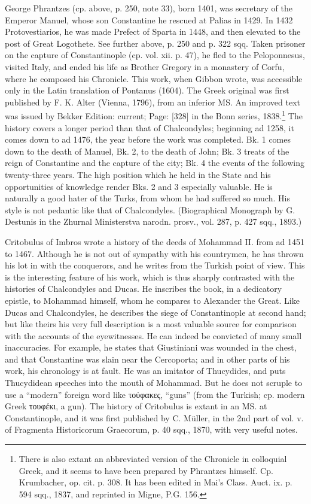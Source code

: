 George Phrantzes (cp. above, p. 250, note 33), born 1401, was secretary of the Emperor Manuel, whose son Constantine he rescued at Palias in 1429. In 1432 Protovestiarios, he was made Prefect of Sparta in 1448, and then elevated to the post of Great Logothete. See further above, p. 250 and p. 322 sqq. Taken prisoner on the capture of Constantinople (cp. vol. xii. p. 47), he fled to the Peloponnesus, visited Italy, and ended his life as Brother Gregory in a monastery of Corfu, where he composed his Chronicle. This work, when Gibbon wrote, was accessible only in the Latin translation of Pontanus (1604). The Greek original was first published by F. K. Alter (Vienna, 1796), from an inferior MS. An improved text was issued by Bekker Edition: current; Page: [328] in the Bonn series, 1838.\footnote{There is also extant an abbreviated version of the Chronicle in colloquial Greek, and it seems to have been prepared by Phrantzes himself. Cp. Krumbacher, op. cit. p. 308. It has been edited in Mai\texthebrew{}’s Class. Auct. ix. p. 594 sqq., 1837, and reprinted in Migne, P.G. 156.} The history covers a longer period than that of Chalcondyles; beginning ad 1258, it comes down to ad 1476, the year before the work was completed. Bk. 1 comes down to the death of Manuel, Bk. 2, to the death of John; Bk. 3 treats of the reign of Constantine and the capture of the city; Bk. 4 the events of the following twenty-three years. The high position which he held in the State and his opportunities of knowledge render Bks. 2 and 3 especially valuable. He is naturally a good hater of the Turks, from whom he had suffered so much. His style is not pedantic like that of Chalcondyles. (Biographical Monograph by G. Destunis in the Zhurnal Ministerstva narodn. prosv., vol. 287, p. 427 sqq., 1893.)

Critobulus of Imbros wrote a history of the deeds of Mohammad II. from ad 1451 to 1467. Although he is not out of sympathy with his countrymen, he has thrown his lot in with the conquerors, and he writes from the Turkish point of view. This is the interesting feature of his work, which is thus sharply contrasted with the histories of Chalcondyles and Ducas. He inscribes the book, in a dedicatory epistle, to Mohammad himself, whom he compares to Alexander the Great. Like Ducas and Chalcondyles, he describes the siege of Constantinople at second hand; but like theirs his very full description is a most valuable source for comparison with the accounts of the eyewitnesses. He can indeed be convicted of many small inaccuracies. For example, he states that Giustiniani was wounded in the chest, and that Constantine was slain near the Cercoporta; and in other parts of his work, his chronology is at fault. He was an imitator of Thucydides, and puts Thucydidean speeches into the mouth of Mohammad. But he does not scruple to use a \texthebrew{“}modern\texthebrew{}” foreign word like \textgreek{τούφακες}, \texthebrew{“}guns\texthebrew{}” (from the Turkish; cp. modern Greek \textgreek{τουφέκι}, a gun). The history of Critobulus is extant in an MS. at Constantinople, and it was first published by C. Müller, in the 2nd part of vol. v. of Fragmenta Historicorum Graecorum, p. 40 sqq., 1870, with very useful notes.

